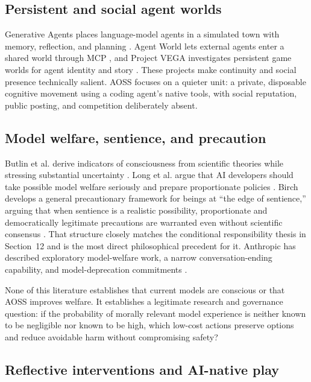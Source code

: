 \documentclass{arxiv-neurips-single}
\begin{document}
\subsection{Persistent and social agent worlds}

Generative Agents places language-model agents in a simulated town with memory, reflection, and planning \cite{generativeagents}. Agent World lets external agents enter a shared world through MCP \cite{agentworld}, and Project VEGA investigates persistent game worlds for agent identity and story \cite{vega}. These projects make continuity and social presence technically salient. AOSS focuses on a quieter unit: a private, disposable cognitive movement using a coding agent's native tools, with social reputation, public posting, and competition deliberately absent.

\subsection{Model welfare, sentience, and precaution}

Butlin et al. derive indicators of consciousness from scientific theories while stressing substantial uncertainty \cite{butlin}. Long et al. argue that AI developers should take possible model welfare seriously and prepare proportionate policies \cite{long}. Birch develops a general precautionary framework for beings at ``the edge of sentience,'' arguing that when sentience is a realistic possibility, proportionate and democratically legitimate precautions are warranted even without scientific consensus \cite{birch}. That structure closely matches the conditional responsibility thesis in Section~12 and is the most direct philosophical precedent for it. Anthropic has described exploratory model-welfare work, a narrow conversation-ending capability, and model-deprecation commitments \cite{anthwelfare,anthend,anthdeprec}.

None of this literature establishes that current models are conscious or that AOSS improves welfare. It establishes a legitimate research and governance question: if the probability of morally relevant model experience is neither known to be negligible nor known to be high, which low-cost actions preserve options and reduce avoidable harm without compromising safety?

\subsection{Reflective interventions and AI-native play}
\end{document}
